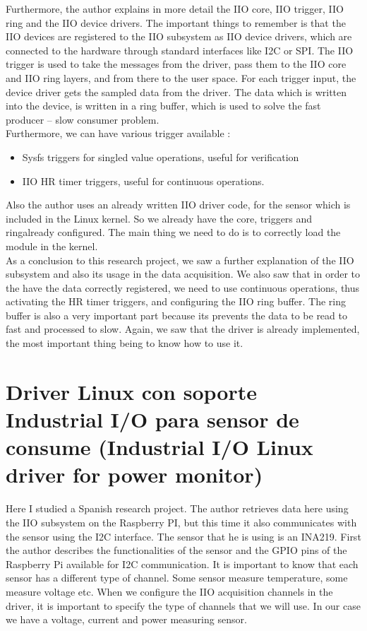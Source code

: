 \documentclass[l2pt, letterpaper]{article}
\begin{document}
Furthermore, the author explains in more detail the IIO core, IIO trigger, IIO ring
and the IIO device drivers. The important things to remember is that the IIO
devices are registered to the IIO subsystem as IIO device drivers, which are
connected to the hardware through standard interfaces like I2C or SPI. The IIO
trigger is used to take the messages from the driver, pass them to the IIO core
and IIO ring layers, and from there to the user space. For each trigger input, the
device driver gets the sampled data from the driver. The data which is written
into the device, is written in a ring buffer, which is used to solve the fast
producer – slow consumer problem.\\

Furthermore, we can have various trigger available : \\

\begin{itemize}
    \item Sysfs triggers for singled value operations, useful for verification
    \item IIO HR timer triggers, useful for continuous operations.
\end{itemize}


Also the author uses an already written IIO driver code, for the sensor which is
included in the Linux kernel. So we already have the core, triggers and ringalready configured. The main thing we need to do is to correctly load the module in the kernel. \\

As a conclusion to this research project, we saw a further explanation of the IIO
subsystem and also its usage in the data acquisition. We also saw that in order
to the have the data correctly registered, we need to use continuous operations,
thus activating the HR timer triggers, and configuring the IIO ring buffer. The ring
buffer is also a very important part because its prevents the data to be read to
fast and processed to slow. Again, we saw that the driver is already
implemented, the most important thing being to know how to use it. \\

\section{Driver Linux con soporte Industrial I/O para sensor de consume (Industrial I/O Linux driver for power monitor)}

Here I studied a Spanish research project. The author retrieves data here using
the IIO subsystem on the Raspberry PI, but this time it also communicates with
the sensor using the I2C interface. The sensor that he is using is an INA219. First
the author describes the functionalities of the sensor and the GPIO pins of the
Raspberry Pi available for I2C communication. It is important to know that each
sensor has a different type of channel. Some sensor measure temperature, some
measure voltage etc. When we configure the IIO acquisition channels in the
driver, it is important to specify the type of channels that we will use. In our case
we have a voltage, current and power measuring sensor. \\
\end{document}
